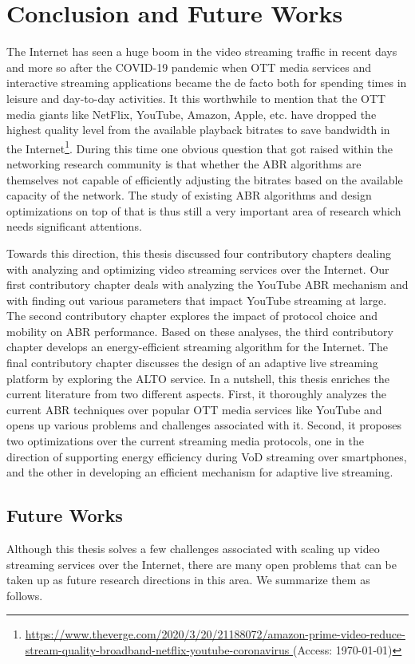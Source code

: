 \chapter{Conclusion and Future Works}
The Internet has seen a huge boom in the video streaming traffic in recent days and more so after the COVID-19 pandemic when OTT media services and interactive streaming applications became the de facto both for spending times in leisure and day-to-day activities. It this worthwhile to mention that the OTT media giants like NetFlix, YouTube, Amazon, Apple, etc. have dropped the highest quality level from the available playback bitrates to save bandwidth in the Internet\footnote{\url{https://www.theverge.com/2020/3/20/21188072/amazon-prime-video-reduce-stream-quality-broadband-netflix-youtube-coronavirus
} (Access: \today)}. During this time one obvious question that got raised within the networking research community is that whether the ABR algorithms are themselves not capable of efficiently adjusting the bitrates based on the available capacity of the network. The study of existing ABR algorithms and design optimizations on top of that is thus still a very important area of research which needs significant attentions.  

Towards this direction, this thesis discussed four contributory chapters dealing with analyzing and optimizing video streaming services over the Internet. Our first contributory chapter deals with analyzing the YouTube ABR mechanism and with finding out various parameters that impact YouTube streaming at large. The second contributory chapter explores the impact of protocol choice and mobility on ABR performance. Based on these analyses, the third contributory chapter develops an energy-efficient streaming algorithm for the Internet. The final contributory chapter discusses the design of an adaptive live streaming platform by exploring the ALTO service. In a nutshell, this thesis enriches the current literature from two different aspects. First, it thoroughly analyzes the current ABR techniques over popular OTT media services like YouTube and opens up various problems and challenges associated with it. Second, it proposes two optimizations over the current streaming media protocols, one in the direction of supporting energy efficiency during VoD streaming over smartphones, and the other in developing an efficient mechanism for adaptive live streaming.

\section{Future Works}
Although this thesis solves a few challenges associated with scaling up video streaming services over the Internet, there are many open problems that can be taken up as future research directions in this area. We summarize them as follows. 

